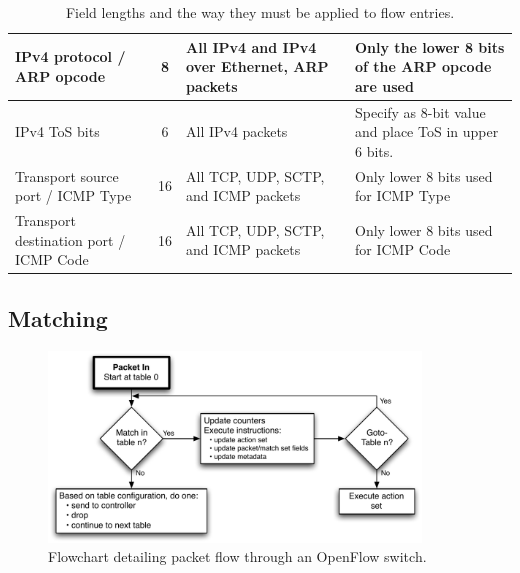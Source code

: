 \documentclass[10pt]{article}
\begin{document}
\begin{table}[hbp]
\begin{tabularx}{\textwidth}{ |X|c|X|X| }
\hline IPv4 protocol / ARP opcode & 8 & All IPv4 and IPv4 over Ethernet, ARP packets & Only the lower 8 bits of the ARP opcode are used \\
\hline IPv4 ToS bits & 6 & All IPv4 packets & Specify as 8-bit value and place ToS in upper 6 bits. \\
\hline Transport source port / ICMP Type & 16 & All TCP, UDP, SCTP, and ICMP packets & Only lower 8 bits used for ICMP Type \\
\hline Transport destination port / ICMP Code & 16 & All TCP, UDP, SCTP, and ICMP packets & Only lower 8 bits used for ICMP Code \\
\hline
\end{tabularx}
\caption{Field lengths and the way they must be applied to flow entries.}
\label{table:header field details}
\end{table}

\subsection{Matching}
\label{sec:matching}
\begin{figure}[!htb]
\centering
\includegraphics[height=2.0in]{packet_flow_flowchart}
\caption{Flowchart detailing packet flow through an OpenFlow switch.}
\label{fig:packet_flow}
\end{figure}
\end{document}
